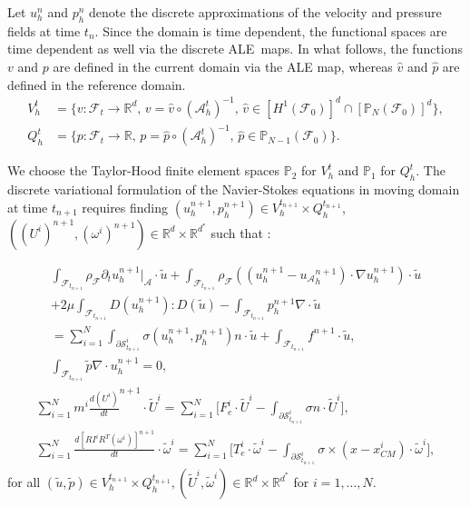 \documentclass[graybox]{svmult}
\newcommand{\Fluid}{\mathcal{F}} %
\newcommand{\Alemap}{\mathcal{A}} %
\newcommand{\ALE}{ALE} %
\newcommand{\Vel}{u} %
\newcommand{\Pres}{p} %
\newcommand{\tvel}{U} %
\newcommand{\angvel}{\omega} %
\newcommand{\CenterMassi}{x_{CM}^i}
\newcommand{\Solid}{\mathcal{S}} %
\newcommand{\normal}{n} %
\newcommand{\CompDomain}{\Fluid}
\begin{document}
Let $\Vel_h^n$ and $\Pres_h^n$ denote the discrete approximations of the velocity and pressure fields at time $t_n$. Since the domain is time dependent, the functional spaces are time dependent as well via the discrete \ALE\ maps. In what follows, the functions $v$ and $p$ are defined in the current domain via the ALE map, whereas $\hat{v}$ and $\hat{p}$ are defined in the reference domain.
\begin{equation}
	\begin{aligned}
		V_h^t &= \{v: \CompDomain_t \to \mathbb{R}^d, \, v = \hat{v} \circ (\mathcal{A}_h^t)^{-1}, \, \hat{v} \in [H^1(\CompDomain_0)]^d \cap [\mathbb{P}_N(\CompDomain_0)]^d  \}, \\
		Q_h^t &= \{\Pres : \CompDomain_t \to \mathbb{R}, \, \Pres = \hat{\Pres} \circ (\Alemap_h^t)^{-1}, \, \hat{\Pres} \in\mathbb{P}_{N-1}(\CompDomain_0) \}.
	\end{aligned}
	\label{Eq:FEMspace}
\end{equation}

We choose the Taylor-Hood finite element spaces $\mathbb{P}_{2}$ for $V_h^t$ and $\mathbb{P}_{1}$ for $Q_h^t$. The discrete variational formulation of the Navier-Stokes equations in moving domain at time $t_{n+1}$ requires finding $(\Vel_h^{n+1}, \Pres_h^{n+1}) \in V_h^{t_{n+1}} \times Q_h^{t_{n+1}}$, $((\tvel^i)^{n+1},(\angvel^i)^{n+1})\in \mathbb{R}^d\times \mathbb{R}^{d^*}$ such that : 

\color{black}
\begin{eqnarray*}
\int_{\CompDomain_{t_{n+1}}} \rho_\Fluid \partial_t \Vel_h^{n+1}|_\Alemap  \cdot \tilde{\Vel} + \int_{\CompDomain_{t_{n+1}}} \rho_\Fluid ((\Vel_h^{n+1}-{\Vel_{\mathcal{A}}}_h^{n+1} )\cdot \nabla u_h^{n+1}) \cdot \tilde{\Vel}
 \\+ 2\mu \int_{\CompDomain_{t_{n+1}}} D(\Vel_h^{n+1}) : D( \tilde{\Vel}) -  \int_{\CompDomain_{t_{n+1}}} \Pres_h^{n+1} \nabla \cdot \tilde{\Vel} \\
 = \sum_{i=1}^N \int_{\partial \Solid_{t_{n+1}}^i} \sigma(\Vel_h^{n+1},\Pres_h^{n+1}) n \cdot \tilde{\Vel}
 + \int_{\CompDomain_{t_{n+1}}} f^{n+1} \cdot \tilde{\Vel},\\
 	\int_{\CompDomain_{t_{n+1}}} \tilde{\Pres} \nabla \cdot \Vel_h^{n+1} = 0,
  \end{eqnarray*}
  \begin{eqnarray*}
  \sum_{i=1}^N m^i \frac{d (\tvel^i)}{dt}^{n+1}\cdot \tilde{\tvel}^i = \sum_{i=1}^N \bigl[ F_e^i \cdot \tilde{\tvel}^i - \int_{\partial \Solid^i_{t_{n+1}}} \sigma \normal \cdot \tilde{\tvel}^i \bigr] ,
  \\ \sum_{i=1}^N \frac{d[R I^i R^T (\angvel^i)]^{n+1}}{dt} \cdot \tilde{\angvel}^i = \sum_{i=1}^N  \bigl[ T_e^i \cdot \tilde{\angvel}^i  -\int_{\partial \Solid^i_{t_{n+1}}} \sigma \times (x-\CenterMassi) \cdot  \tilde{\angvel}^i \bigr],
\label{Eq:discrete-var_form}
\end{eqnarray*}
for all $(\tilde{\Vel},\tilde{\Pres}) \in V_{h}^{t_{n+1}} \times Q_h^{t_{n+1}}, (\tilde{\tvel}^i,\tilde{\angvel}^i) \in \mathbb{R}^d\times \mathbb{R}^{d^*}$ for $i=1,\dots,N$.
\end{document}
